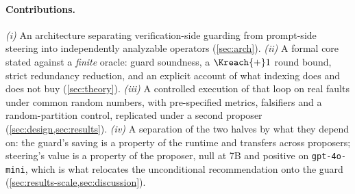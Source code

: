 \paragraph{Contributions.}
\emph{(i)} An architecture separating verification-side guarding from
prompt-side steering into independently analyzable operators
(\cref{sec:arch}).
\emph{(ii)} A formal core stated against a \emph{finite} oracle: guard
soundness, a $\Kreach{+}1$ round bound, strict redundancy reduction, and an
explicit account of what indexing does and does not buy (\cref{sec:theory}).
\emph{(iii)} A controlled execution of that loop on real faults under common
random numbers, with pre-specified metrics, falsifiers and a random-partition
control, replicated under a second proposer (\cref{sec:design,sec:results}).
\emph{(iv)} A separation of the two halves by what they depend on: the guard's
saving is a property of the runtime and transfers across proposers; steering's
value is a property of the proposer, null at 7B and positive on
\texttt{gpt-4o-mini}, which is what relocates the unconditional
recommendation onto the guard (\cref{sec:results-scale,sec:discussion}).
